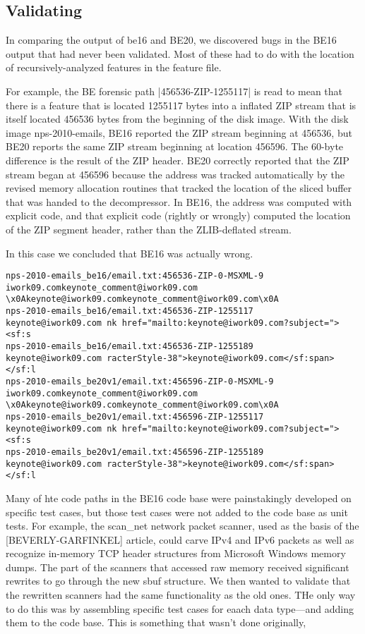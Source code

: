 \documentclass[5p]{elsarticle}
\begin{document}
\subsection{Validating}

In comparing the output of be16 and BE20, we discovered bugs in the
BE16 output that had never been validated. Most of these had to do
with the location of recursively-analyzed features in the feature
file.

For example, the BE forensic path |456536-ZIP-1255117| is read to mean
that there is a feature that is located 1255117 bytes into a
inflated ZIP stream that is itself located 456536 bytes from the
beginning of the disk image. With the disk image nps-2010-emails, BE16
reported the ZIP stream beginning at 456536, but BE20 reports the same
ZIP stream beginning at location 456596. The 60-byte difference is the
result of the ZIP header. BE20 correctly reported that the ZIP stream
began at 456596 because the address was tracked automatically by the
revised memory allocation routines that tracked the location of the
sliced buffer that was handed to the decompressor. In BE16, the
address was computed with explicit code, and that explicit code
(rightly or wrongly) computed the location of the ZIP segment header,
rather than the ZLIB-deflated stream.

In this case we concluded that BE16 was actually wrong.

\begin{figure*}
\begin{Verbatim}
nps-2010-emails_be16/email.txt:456536-ZIP-0-MSXML-9	iwork09.comkeynote_comment@iwork09.com	\x0Akeynote@iwork09.comkeynote_comment@iwork09.com\x0A
nps-2010-emails_be16/email.txt:456536-ZIP-1255117	keynote@iwork09.com	nk href="mailto:keynote@iwork09.com?subject="><sf:s
nps-2010-emails_be16/email.txt:456536-ZIP-1255189	keynote@iwork09.com	racterStyle-38">keynote@iwork09.com</sf:span></sf:l
nps-2010-emails_be20v1/email.txt:456596-ZIP-0-MSXML-9	iwork09.comkeynote_comment@iwork09.com	\x0Akeynote@iwork09.comkeynote_comment@iwork09.com\x0A
nps-2010-emails_be20v1/email.txt:456596-ZIP-1255117	keynote@iwork09.com	nk href="mailto:keynote@iwork09.com?subject="><sf:s
nps-2010-emails_be20v1/email.txt:456596-ZIP-1255189	keynote@iwork09.com	racterStyle-38">keynote@iwork09.com</sf:span></sf:l
\end{Verbatim}
\end{figure*}

Many of hte code paths in the BE16 code base were painstakingly
developed on specific test cases, but those test cases were not added
to the code base as unit tests. For example, the scan\_net network
packet scanner, used as the basis of the [BEVERLY-GARFINKEL] article,
could carve IPv4 and IPv6 packets as well as recognize in-memory TCP
header structures from Microsoft Windows memory dumps. The part of the
scanners that accessed raw memory received significant rewrites to go
through the new sbuf structure. We then wanted to validate that the
rewritten scanners had the same functionality as the old ones. THe
only way to do this was by assembling specific test cases for eaach
data type---and adding them to the code base. This is something that
wasn't done originally,
\end{document}
